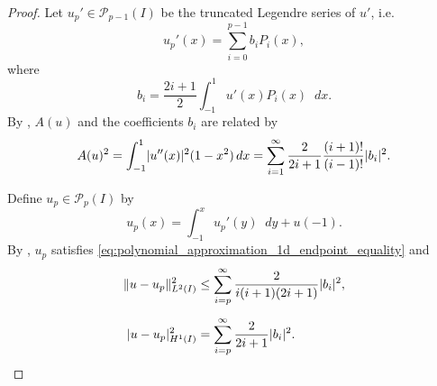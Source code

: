 \documentclass[english, 12pt, a4paper, sci, utf8, a-2b, online]{aaltothesis}
\theoremstyle{definition}
\theoremstyle{plain}
\DeclarePairedDelimiter\abs{\lvert}{\rvert}
\DeclarePairedDelimiter\norm{\lVert}{\rVert}
\newcommand*\diff{\mathop{}\!d}
\numberwithin{equation}{section}
\begin{document}
\begin{proof}
    Let $u_p' \in \mathcal{P}_{p-1}(I)$ be the truncated Legendre series
    of $u'$, i.e.\
    \begin{equation*}
        u_p'(x) = \sum_{i=0}^{p-1} b_i P_i(x),
    \end{equation*}
    where
    \begin{equation*}
        b_i = \frac{2i+1}{2} \int_{-1}^{1} u'(x) P_i(x) \diff x.
    \end{equation*}
    By \cite[Theorem 3.10 on p.\ 71]{schwab1998},
    $A(u)$ and the coefficients $b_i$ are related by
    \begin{equation}
        \label{eq:eq:polynomial_approximation_1d_A}
        A(u)^2
        = \int_{-1}^{1} \abs{u''(x)}^2 (1-x^2) \diff x
        = \sum_{i=1}^{\infty} \frac{2}{2i+1} \frac{(i+1)!}{(i-1)!} \abs{b_i}^2.
    \end{equation}
    
    Define $u_p \in \mathcal{P}_p(I)$ by
    \begin{equation*}
        u_p(x) = \int_{-1}^{x} u_p'(y) \diff y + u(-1).
    \end{equation*}
    By \cite[Theorem 3.14 on p.\ 73]{schwab1998},
    $u_p$ satisfies \eqref{eq:polynomial_approximation_1d_endpoint_equality} and
    \begin{align*}
        \norm{u-u_p}_{L^2(I)}^2
            &\leq \sum_{i=p}^{\infty} \frac{2}{i(i+1)(2i+1)} \abs{b_i}^2, \\[0.5em]
        \abs{u-u_p}_{H^1(I)}^2
            &= \sum_{i=p}^{\infty} \frac{2}{2i+1} \abs{b_i}^2.
    \end{align*}


\end{proof}
\end{document}
